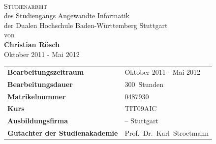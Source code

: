 \thispagestyle{empty}

\parbox[t]{\paperwidth}{}
\begin{center}
	\vspace{15mm}	{\LARGE\bf\thema}\\
	\vspace{20mm}	{\Large\textsc{Studienarbeit}}\\
	\vspace{15mm}	des Studiengangs Angewandte Informatik\\der Dualen Hochschule Baden-Württemberg Stuttgart\\
	\vspace{7,5mm}	von\\
	\vspace{7,5mm}	{\textbf{Christian Rösch}}\\
	\vspace{10mm}	Oktober 2011 - Mai 2012
\end{center}

\vfill

\begin{tabular*}{\textwidth}{p{7cm}l}
  \textbf{Bearbeitungszeitraum} &  Oktober 2011 - Mai 2012\\
  \textbf{Bearbeitungsdauer}    &  300~Stunden\\
  \textbf{Matrikelnummer}       &  0487930\\
  \textbf{Kurs}                	&  TIT09AIC\\
  \textbf{Ausbildungsfirma}     &  \icon{} -- Stuttgart\\
  \textbf{Gutachter der Studienakademie} & Prof.~Dr.~Karl~Stroetmann\\
\end{tabular*}
